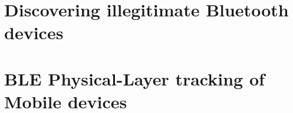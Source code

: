 \documentclass[12pt]{ucsddissertation}
\begin{document}
\frontmatter
\maketitle
\makecopyright
\makesignature



\tableofcontents
\listoffigures
\listoftables









\mainmatter



\chapter{Discovering illegitimate Bluetooth devices}


\chapter{BLE Physical-Layer tracking of Mobile devices}


\appendix

\backmatter

\end{document}
